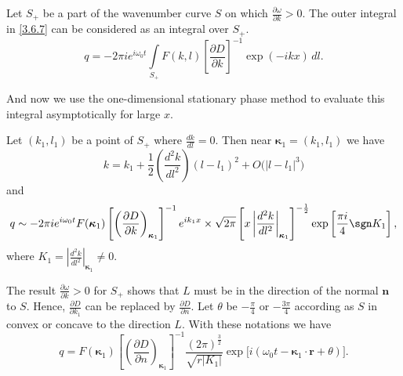 Let $S_+$ be a part of the wavenumber curve $S$ on which $\frac{\partial \omega}{\partial k} > 0$. The outer integral in \eqref{3.6.7} can be considered as an integral over $S_+$.
\[
  q = -2\pi i e^{i\omega_0 t}\int\limits_{S_+} F(k,l)\left[\frac{\partial D}{\partial k}\right]^{-1} \exp(-i k x)\,dl.
\]

And now we use the one-dimensional stationary phase method to evaluate this integral asymptotically for large $x$.

Let $(k_1,l_1)$ be a point of $S_+$ where $\frac{dk}{dl}=0$. Then near $\boldsymbol \kappa_1 = (k_1,l_1)$ we have
\[
  k = k_1 + \frac12 \left(\frac{d^2k}{dl^2}\right)(l-l_1)^2 + O\big(|l-l_1|^3\big)
\]
and
\[
  q\sim -2\pi i e^{i\omega_0 t} F(\boldsymbol \kappa_1)\left[\left( \frac{\partial D}{\partial k} \right)_{\boldsymbol \kappa_1}\right]^{-1} e^{i k_1 x} \times
  \sqrt{2\pi} \left[x\left|\frac{d^2k}{dl^2}\right|_{\boldsymbol\kappa_1}\right]^{-\frac12} \exp\left[\frac{\pi i}4\sgn K_1\right],
\]
where $K_1 = \left|\frac{d^2k}{dl^2}\right|_{\boldsymbol\kappa_1} \ne 0$.

The result $\frac{\partial \omega}{\partial k} > 0$ for $S_+$ shows that $L$ must be in the direction of the normal $\boldsymbol n$ to $S$. Hence, $\frac{\partial D}{\partial k_1}$ can be replaced by $\frac{\partial D}{\partial n}$. Let $\theta$ be $-\frac\pi4$ or $-\frac{3\pi}4$ according as $S$ in convex or concave to the direction $L$. With these notations we have
\[
  q = F(\boldsymbol \kappa_1)\left[\left( \frac{\partial D}{\partial n} \right)_{\boldsymbol\kappa_1}\right]^{-1}
  \frac{(2\pi)^{\frac32}}{\sqrt{r|K_1|}}\exp\big[i(\omega_0t - \boldsymbol\kappa_1\cdot \boldsymbol r + \theta)\big].
\]
